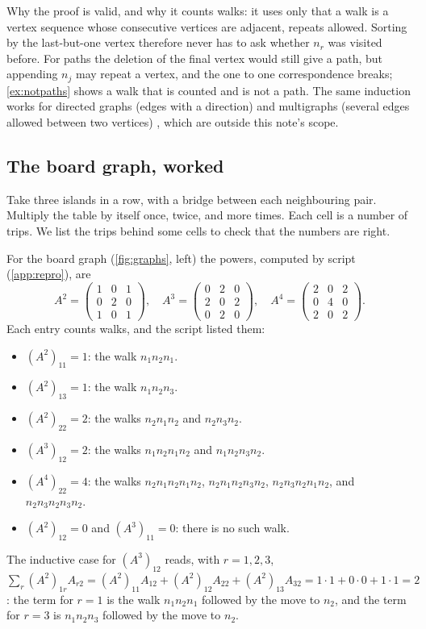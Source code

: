 Why the proof is valid, and why it counts walks: it uses only that a walk is
a vertex sequence whose consecutive vertices are adjacent, repeats allowed.
Sorting by the last-but-one vertex therefore never has to ask whether
$n_r$ was visited before. For paths the deletion of the final vertex would
still give a path, but appending $n_j$ may repeat a vertex, and the one to
one correspondence breaks; \cref{ex:notpaths} shows a walk that is counted
and is not a path. The same induction works for directed graphs (edges
with a direction) and multigraphs (several edges allowed between two
vertices) \cite[Proposition~2, p.~1]{gotti18211}, which are outside this
note's scope.

\subsection{The board graph, worked}

\plainwords{} Take three islands in a row, with a bridge between each
neighbouring pair. Multiply the table by itself once, twice, and more
times. Each cell is a number of trips. We list the trips behind some cells
to check that the numbers are right.

\begin{example}\label{ex:powers}
For the board graph (\cref{fig:graphs}, left) the powers, computed by
script (\cref{app:repro}), are
\[
A^2=\begin{pmatrix}1&0&1\\0&2&0\\1&0&1\end{pmatrix},\quad
A^3=\begin{pmatrix}0&2&0\\2&0&2\\0&2&0\end{pmatrix},\quad
A^4=\begin{pmatrix}2&0&2\\0&4&0\\2&0&2\end{pmatrix}.
\]
Each entry counts walks, and the script listed them:
\begin{itemize}
\item $(A^2)_{11}=1$: the walk $n_1n_2n_1$.
\item $(A^2)_{13}=1$: the walk $n_1n_2n_3$.
\item $(A^2)_{22}=2$: the walks $n_2n_1n_2$ and $n_2n_3n_2$.
\item $(A^3)_{12}=2$: the walks $n_1n_2n_1n_2$ and $n_1n_2n_3n_2$.
\item $(A^4)_{22}=4$: the walks $n_2n_1n_2n_1n_2$, $n_2n_1n_2n_3n_2$,
  $n_2n_3n_2n_1n_2$, and $n_2n_3n_2n_3n_2$.
\item $(A^2)_{12}=0$ and $(A^3)_{11}=0$: there is no such walk.
\end{itemize}
The inductive case for $(A^3)_{12}$ reads, with $r=1,2,3$,
$\sum_r(A^2)_{1r}A_{r2}=(A^2)_{11}A_{12}+(A^2)_{12}A_{22}+(A^2)_{13}A_{32}
=1\cdot 1+0\cdot 0+1\cdot 1=2$: the term for $r=1$ is the walk $n_1n_2n_1$ followed by the move to $n_2$, and the term for
$r=3$ is $n_1n_2n_3$ followed by the move to $n_2$.
\end{example}

